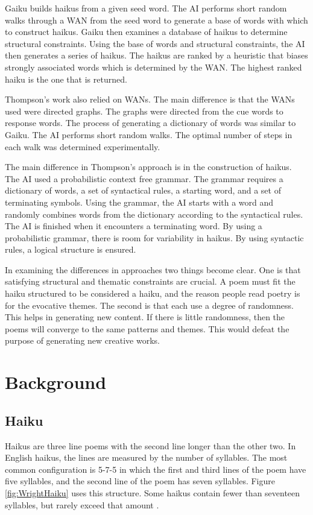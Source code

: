 \documentclass[]{article}
\begin{document}
Gaiku builds haikus from a given seed word. The AI performs short random walks through a WAN from the seed word to generate a base of words with which to construct haikus. Gaiku then examines a database of haikus to determine structural constraints. Using the base of words and structural constraints, the AI then generates a series of haikus. The haikus are ranked by a heuristic that biases strongly associated words which is determined by the WAN. The highest ranked haiku is the one that is returned.

Thompson's work also relied on WANs. The main difference is that the WANs used were directed graphs. The graphs were directed from the cue words to response words. The process of generating a dictionary of words was similar to Gaiku. The AI performs short random walks. The optimal number of steps in each walk was determined experimentally\cite{grammars}.

The main difference in Thompson's approach is in the construction of haikus. The AI used a probabilistic context free grammar. The grammar requires a dictionary of words, a set of syntactical rules, a starting word, and a set of terminating symbols. Using the grammar, the AI starts with a word and randomly combines words from the dictionary according to the syntactical rules. The AI is finished when it encounters a terminating word. By using a probabilistic grammar, there is room for variability in haikus. By using syntactic rules, a logical structure is ensured.

In examining the differences in approaches two things become clear. One is that satisfying structural and thematic constraints are crucial. A poem must fit the haiku structured to be considered a haiku, and the reason people read poetry is for the evocative themes. The second is that each use a degree of randomness. This helps in generating new content. If there is little randomness, then the poems will converge to the same patterns and themes. This would defeat the purpose of generating new creative works.

\section{Background}

\subsection{Haiku}
Haikus are three line poems with the second line longer than the other two. In English haikus, the lines are measured by the number of syllables. The most common configuration is 5-7-5 in which the first and third lines of the poem have five syllables, and the second line of the poem has seven syllables. Figure \ref{fig:WrightHaiku} uses this structure. Some haikus contain fewer than seventeen syllables, but rarely exceed that amount \cite{Higginson}.
\end{document}
